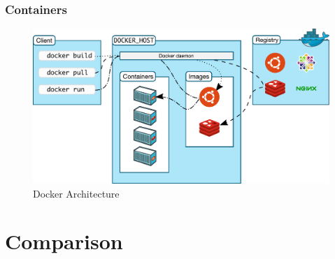 \documentclass[aspectratio=169]{beamer}
\begin{document}
\begin{frame}
\frametitle{Containers}
\begin{figure}[htbp]
\centering
\includegraphics[scale=0.47]{img/docker-architecture.pdf}
\caption{Docker Architecture}
\end{figure}
\end{frame}

\section{Comparison}
\end{document}
